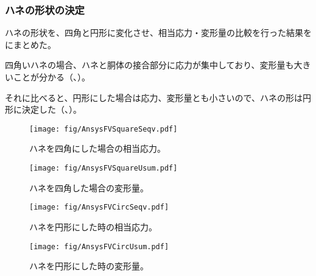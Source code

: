 \newpage
\subsubsection{ハネの形状の決定}
ハネの形状を、四角と円形に変化させ、相当応力・変形量の比較を行った結果をにまとめた。

四角いハネの場合、ハネと胴体の接合部分に応力が集中しており、変形量も大きいことが分かる（、）。

それに比べると、円形にした場合は応力、変形量とも小さいので、ハネの形は円形に決定した（、）。

\begin{figure}[htbp]
\begin{minipage}{0.47\textwidth}
\centering
\texttt{[image: fig/AnsysFVSquareSeqv.pdf]}
\caption[ハネを四角にした場合の相当応力]{ハネを四角にした場合の相当応力。}
\label{AnsysFVSquareSeqv}
\end{minipage}
\hfill
\begin{minipage}{0.47\textwidth}
\centering
\texttt{[image: fig/AnsysFVSquareUsum.pdf]}
\caption[ハネを四角にした場合の変形量]{ハネを四角した場合の変形量。}
\label{AnsysFVSquareUsum}
\end{minipage}
\end{figure}

\begin{figure}[htbp]
\begin{minipage}{0.47\textwidth}
\centering
\texttt{[image: fig/AnsysFVCircSeqv.pdf]}
\caption[ハネを円形にした時の相当応力]{ハネを円形にした時の相当応力。}
\label{AnsysFVCircSeqv}
\end{minipage}
\hfill
\begin{minipage}{0.47\textwidth}
\centering
\texttt{[image: fig/AnsysFVCircUsum.pdf]}
\caption[ハネを円形にした時の変形量]{ハネを円形にした時の変形量。}
\label{AnsysFVCircUsum}
\end{minipage}
\end{figure}
\fi%

